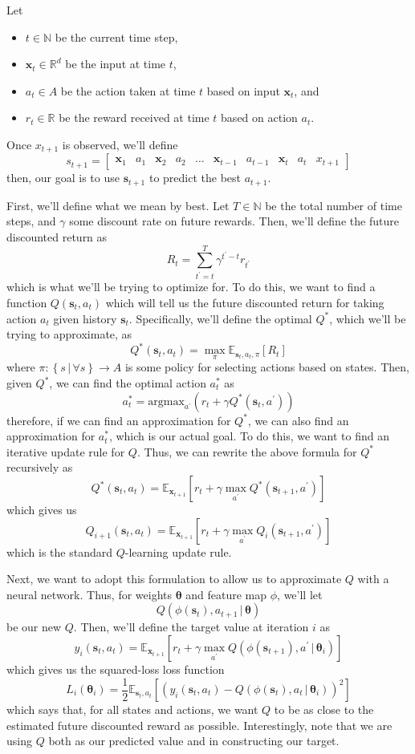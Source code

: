 \documentclass[12pt,letterpaper]{hmcpset}
\newcommand{\m}[1]{\begin{bmatrix}#1\end{bmatrix}}
\newcommand{\tx}[1]{\text{#1}}
\newcommand{\pn}[1]{\left(#1\right)}
\newcommand{\bk}[1]{\left[#1\right]}
\newcommand{\set}[1]{\left\{#1\right\}}
\newcommand{\given}{\,|\,}
\newcommand{\bbm}[1]{\mathbb{#1}}
\begin{document}
Let
\begin{itemize}
\item $t \in \bbm N$ be the current time step,
\item $\bm x_t \in \bbm R^d$ be the input at time $t$,
\item $a_t \in A$ be the action taken at time $t$ based on input $\bm x_t$, and
\item $r_t \in \bbm R$ be the reward received at time $t$ based on action $a_t$.
\end{itemize}
Once $x_{t+1}$ is observed, we'll define
\[
    s_{t+1} = \m{\bm x_1 & a_1 & \bm x_2 & a_2 & \ldots & \bm x_{t-1} & a_{t-1} & \bm x_t & a_t & x_{t+1}}
\]
then, our goal is to use $\bm s_{t+1}$ to predict the best $a_{t+1}$.

First, we'll define what we mean by best. Let $T \in \bbm N$ be the total number of time steps, and $\gamma$ some discount rate on future rewards. Then, we'll define the future discounted return as
\[
    R_t = \sum_{t^\prime = t}^T \gamma^{t^\prime - t} r_{t^\prime}
\]
which is what we'll be trying to optimize for. To do this, we want to find a function $Q(\bm s_t, a_t)$ which will tell us the future discounted return for taking action $a_t$ given history $\bm s_t$. Specifically, we'll define the optimal $Q^*$, which we'll be trying to approximate, as
\[
    Q^*(\bm s_t, a_t) = \max_\pi \bbm E_{\bm s_t, a_t, \pi} \bk{R_t}
\]
where $\pi: \set{s \given \forall s} \to A$ is some policy for selecting actions based on states. Then, given $Q^*$, we can find the optimal action $a_t^*$ as
\[
    a_t^* = \tx{argmax}_{a^\prime}\pn{r_t + \gamma Q^*(\bm s_t, a^\prime)}
\]
therefore, if we can find an approximation for $Q^*$, we can also find an approximation for $a_t^*$, which is our actual goal. To do this, we want to find an iterative update rule for $Q$. Thus, we can rewrite the above formula for $Q^*$ recursively as
\[
    Q^*(\bm s_t, a_t) = \bbm E_{\bm x_{t+1}} \bk{r_t + \gamma \max_{a^\prime} Q^*(\bm s_{t+1}, a^\prime)}
\]
which gives us
\[
    Q_{i+1}(\bm s_t, a_t) = \bbm E_{\bm x_{t+1}} \bk{r_t + \gamma \max_{a^\prime} Q_i(\bm s_{t+1}, a^\prime)}
\]
which is the standard $Q$-learning update rule.

Next, we want to adopt this formulation to allow us to approximate $Q$ with a neural network. Thus, for weights $\bm\theta$ and feature map $\phi$, we'll let
\[
    Q(\phi(\bm s_t), a_{t+1} \given \bm\theta)
\]
be our new $Q$. Then, we'll define the target value at iteration $i$ as
\[
    y_i(\bm s_t, a_t) = \bbm E_{\bm x_{t+1}} \bk{r_t + \gamma \max_{a^\prime} Q(\phi(\bm s_{t+1}), a^\prime \given \bm\theta_i)}
\]
which gives us the squared-loss loss function
\[
    L_i(\bm \theta_i) = \frac{1}{2} \bbm E_{\bm s_t, a_t} \bk{\pn{y_i(\bm s_t, a_t) - Q(\phi(\bm s_t), a_t \given \bm \theta_i)}^2}
\]
which says that, for all states and actions, we want $Q$ to be as close to the estimated future discounted reward as possible. Interestingly, note that we are using $Q$ both as our predicted value and in constructing our target.
\end{document}
